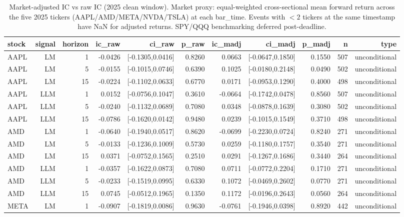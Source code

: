 \begin{table}[htbp]
\centering
\caption{Market-adjusted IC vs raw IC (2025 clean window). Market proxy: equal-weighted cross-sectional mean forward return across the five 2025 tickers (AAPL/AMD/META/NVDA/TSLA) at each bar\_time. Events with $<2$ tickers at the same timestamp have NaN for adjusted returns. SPY/QQQ benchmarking deferred post-deadline.}
\label{tab:market_adjusted_ic}
\begin{tabular}{lrrrrrrrrrr}
\toprule
stock & signal & horizon & ic\_raw & ci\_raw & p\_raw & ic\_madj & ci\_madj & p\_madj & n & type \\
\midrule
AAPL & LM & 1 & -0.0426 & [-0.1305,0.0416] & 0.8260 & 0.0663 & [-0.0647,0.1850] & 0.1550 & 507 & unconditional \\
AAPL & LM & 5 & -0.0155 & [-0.1015,0.0746] & 0.6390 & 0.1025 & [-0.0180,0.2148] & 0.0490 & 502 & unconditional \\
AAPL & LM & 15 & -0.0224 & [-0.1102,0.0633] & 0.6770 & 0.0171 & [-0.0953,0.1290] & 0.4000 & 498 & unconditional \\
AAPL & LLM & 1 & 0.0152 & [-0.0756,0.1047] & 0.3610 & -0.0664 & [-0.1742,0.0478] & 0.8560 & 507 & unconditional \\
AAPL & LLM & 5 & -0.0240 & [-0.1132,0.0689] & 0.7080 & 0.0348 & [-0.0878,0.1639] & 0.3080 & 502 & unconditional \\
AAPL & LLM & 15 & -0.0786 & [-0.1620,0.0142] & 0.9480 & 0.0239 & [-0.1015,0.1549] & 0.3710 & 498 & unconditional \\
AMD & LM & 1 & -0.0640 & [-0.1940,0.0517] & 0.8620 & -0.0699 & [-0.2230,0.0724] & 0.8240 & 271 & unconditional \\
AMD & LM & 5 & -0.0133 & [-0.1236,0.1009] & 0.5730 & 0.0259 & [-0.1180,0.1757] & 0.3540 & 271 & unconditional \\
AMD & LM & 15 & 0.0371 & [-0.0752,0.1565] & 0.2510 & 0.0291 & [-0.1267,0.1686] & 0.3440 & 264 & unconditional \\
AMD & LLM & 1 & -0.0357 & [-0.1622,0.0873] & 0.7080 & 0.0711 & [-0.0772,0.2204] & 0.1710 & 271 & unconditional \\
AMD & LLM & 5 & -0.0233 & [-0.1519,0.0995] & 0.6330 & 0.1072 & [-0.0469,0.2602] & 0.0770 & 271 & unconditional \\
AMD & LLM & 15 & 0.0745 & [-0.0512,0.1965] & 0.1350 & 0.1172 & [-0.0196,0.2643] & 0.0560 & 264 & unconditional \\
META & LM & 1 & -0.0907 & [-0.1819,0.0086] & 0.9630 & -0.0761 & [-0.1946,0.0398] & 0.8920 & 442 & unconditional \\

\end{tabular}
\end{table}
